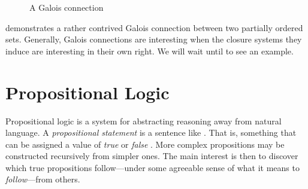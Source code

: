 \begin{figure}[H]
	\caption{A Galois connection}
	\label{figure:Galois-connection}
\end{figure}

 demonstrates a rather contrived Galois connection between two partially ordered sets. Generally,
Galois connections are interesting when the closure systems they induce are interesting in their own right. We will wait
until  to see an example.

\section{Propositional Logic}
\label{section:propositional-logic}

Propositional logic is a system for abstracting reasoning away from natural language. A \textit{propositional statement}
is a sentence like . That is, something that can be assigned a value of \textit{true}
or \textit{false} \cite[p. 7]{Ben1993Mathematical}. More complex propositions may be constructed recursively from
simpler ones. The main interest is then to discover which true propositions follow---under some agreeable sense of what it
means to \textit{follow}---from others.

